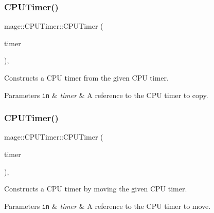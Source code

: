 \subsubsection{\texorpdfstring{C\+P\+U\+Timer()}{CPUTimer()}\hspace{0.1cm}{\footnotesize\ttfamily [3/4]}}
{\footnotesize\ttfamily mage\+::\+C\+P\+U\+Timer\+::\+C\+P\+U\+Timer (\begin{DoxyParamCaption}\item[{const \hyperlink{classmage_1_1_c_p_u_timer}{C\+P\+U\+Timer} \&}]{timer }\end{DoxyParamCaption})\hspace{0.3cm}{\ttfamily [default]}, {\ttfamily [noexcept]}}

Constructs a C\+PU timer from the given C\+PU timer.


\begin{DoxyParams}[1]{Parameters}
\mbox{\tt in}  & {\em timer} & A reference to the C\+PU timer to copy. \\
\hline
\end{DoxyParams}
\hypertarget{classmage_1_1_c_p_u_timer_a7915bc9952e7607ffbe93f18dd1cb0b4}{}\label{classmage_1_1_c_p_u_timer_a7915bc9952e7607ffbe93f18dd1cb0b4} 
\subsubsection{\texorpdfstring{C\+P\+U\+Timer()}{CPUTimer()}\hspace{0.1cm}{\footnotesize\ttfamily [4/4]}}
{\footnotesize\ttfamily mage\+::\+C\+P\+U\+Timer\+::\+C\+P\+U\+Timer (\begin{DoxyParamCaption}\item[{\hyperlink{classmage_1_1_c_p_u_timer}{C\+P\+U\+Timer} \&\&}]{timer }\end{DoxyParamCaption})\hspace{0.3cm}{\ttfamily [default]}, {\ttfamily [noexcept]}}

Constructs a C\+PU timer by moving the given C\+PU timer.


\begin{DoxyParams}[1]{Parameters}
\mbox{\tt in}  & {\em timer} & A reference to the C\+PU timer to move. \\
\hline
\end{DoxyParams}
\hypertarget{classmage_1_1_c_p_u_timer_a32583449026cf0589104767339486d4b}{}\label{classmage_1_1_c_p_u_timer_a32583449026cf0589104767339486d4b} 
